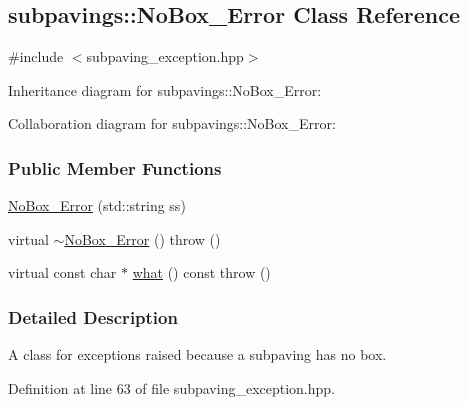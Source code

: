 \hypertarget{classsubpavings_1_1NoBox__Error}{\subsection{subpavings\-:\-:\-No\-Box\-\_\-\-Error \-Class \-Reference}
\label{classsubpavings_1_1NoBox__Error}
}


{\ttfamily \#include $<$subpaving\-\_\-exception.\-hpp$>$}



\-Inheritance diagram for subpavings\-:\-:\-No\-Box\-\_\-\-Error\-:


\-Collaboration diagram for subpavings\-:\-:\-No\-Box\-\_\-\-Error\-:
\subsubsection*{\-Public \-Member \-Functions}
\begin{DoxyCompactItemize}
\item 
\hyperlink{classsubpavings_1_1NoBox__Error_adf521a98f150062f8ebc21b9601affa2}{\-No\-Box\-\_\-\-Error} (std\-::string ss)
\item 
virtual \hyperlink{classsubpavings_1_1NoBox__Error_af0ad737bacfc1a73ff01817e824284ee}{$\sim$\-No\-Box\-\_\-\-Error} ()  throw ()
\item 
virtual const char $\ast$ \hyperlink{classsubpavings_1_1NoBox__Error_a5dbe27e6e89d7665df1b6dcd814805a0}{what} () const   throw ()
\end{DoxyCompactItemize}


\subsubsection{\-Detailed \-Description}
\-A class for exceptions raised because a subpaving has no box. 

\-Definition at line 63 of file subpaving\-\_\-exception.\-hpp.



